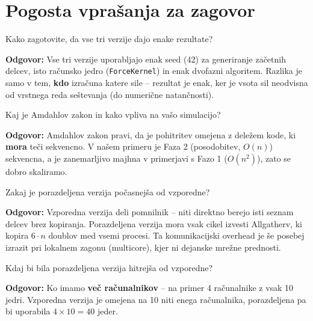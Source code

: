 \documentclass[12pt,a4paper]{article}
\begin{document}
\section{Pogosta vpra\v{s}anja za zagovor}

\begin{vprasanje}
Kako zagotovite, da vse tri verzije dajo enake rezultate?

\textbf{Odgovor:} Vse tri verzije uporabljajo enak seed (42) za generiranje za\v{c}etnih delcev, isto ra\v{c}unsko jedro (\texttt{ForceKernel}) in enak dvofazni algoritem. Razlika je samo v tem, \textbf{kdo} izra\v{c}una katere sile -- rezultat je enak, ker je vsota sil neodvisna od vrstnega reda se\v{s}tevanja (do numeri\v{c}ne natan\v{c}nosti).
\end{vprasanje}

\begin{vprasanje}
Kaj je Amdahlov zakon in kako vpliva na va\v{s}o simulacijo?

\textbf{Odgovor:} Amdahlov zakon pravi, da je pohitritev omejena z dele\v{z}em kode, ki \textbf{mora} te\v{c}i sekvencno. V na\v{s}em primeru je Faza 2 (posodobitev, $O(n)$) sekvencna, a je zanemarljivo majhna v primerjavi s Fazo 1 ($O(n^2)$), zato se dobro skaliramo.
\end{vprasanje}

\begin{vprasanje}
Zakaj je porazdeljena verzija po\v{c}asnej\v{s}a od vzporedne?

\textbf{Odgovor:} Vzporedna verzija deli pomnilnik -- niti direktno berejo isti seznam delcev brez kopiranja. Porazdeljena verzija mora vsak cikel izvesti Allgatherv, ki kopira $6 \cdot n$ doublov med vsemi procesi. Ta komunikacijski overhead je \v{s}e posebej izrazit pri lokalnem zagonu (multicore), kjer ni dejanske mre\v{z}ne prednosti.
\end{vprasanje}

\begin{vprasanje}
Kdaj bi bila porazdeljena verzija hitrej\v{s}a od vzporedne?

\textbf{Odgovor:} Ko imamo \textbf{ve\v{c} ra\v{c}unalnikov} -- na primer 4 ra\v{c}unalnike z vsak 10 jedri. Vzporedna verzija je omejena na 10 niti enega ra\v{c}unalnika, porazdeljena pa bi uporabila $4 \times 10 = 40$ jeder.
\end{vprasanje}
\end{document}
